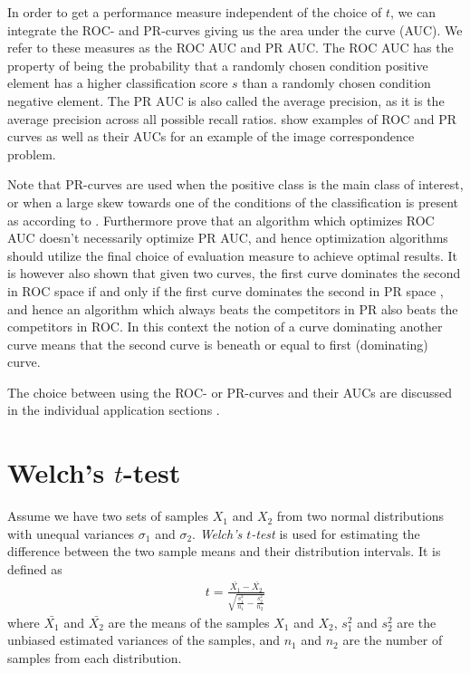 \documentclass[thesis.tex]{subfiles}
\begin{document}
In order to get a performance measure independent of the choice of $t$, we can integrate the ROC- and PR-curves giving us the area under the curve (AUC). We refer to these measures as the ROC AUC and PR AUC. The ROC AUC has the property of being the probability that a randomly chosen condition positive element has a higher classification score $s$ than a randomly chosen condition negative element. The PR AUC is also called the average precision, as it is the average precision across all possible recall ratios.  show examples of ROC and PR curves as well as their AUCs for an example of the image correspondence problem.

Note that PR-curves are used when the positive class is the main class of interest, or when a large skew towards one of the conditions of the classification is present as according to \citet{davis2006relationship}. Furthermore \citet{davis2006relationship} prove that an algorithm which optimizes ROC AUC doesn't necessarily optimize PR AUC, and hence optimization algorithms should utilize the final choice of evaluation measure to achieve optimal results. It is however also shown that given two curves, the first curve dominates the second in ROC space if and only if the first curve dominates the second in PR space \cite[Theorem 3.2]{davis2006relationship}, and hence an algorithm which always beats the competitors in PR also beats the competitors in ROC. In this context the notion of a curve dominating another curve means that the second curve is beneath or equal to first (dominating) curve.

The choice between using the ROC- or PR-curves and their AUCs are discussed in the individual application sections .
%
\section{Welch's $t$-test}
\label{sec:welchsTtest}

Assume we have two sets of samples $X_1$ and $X_2$ from two normal distributions with unequal variances $\sigma_1$ and $\sigma_2$. \emph{Welch's $t$-test} is used for estimating the difference between the two sample means and their distribution intervals. It is defined as
\begin{align*}
	t = \frac{\bar{X_1} - \bar{X_2}}{\sqrt{\frac{s^2_1}{n_1} - \frac{s^2_2}{n_2}}}
\end{align*}
where $\bar{X_1}$ and $\bar{X_2}$ are the means of the samples $X_1$ and $X_2$, $s^2_1$ and $s^2_2$ are the unbiased estimated variances of the samples, and $n_1$ and $n_2$ are the number of samples from each distribution.
\end{document}
